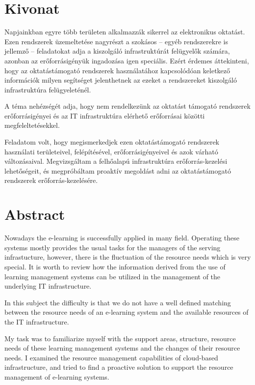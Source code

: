 \chapter*{Kivonat}

Napjainkban egyre több területen alkalmazzák sikerrel az elektronikus oktatást. Ezen rendszerek üzemeltetése nagyrészt a szokásos -- egyéb rendszerekre is jellemző -- feladatokat adja a kiszolgáló infrastruktúrát felügyelők számára, azonban az erőforrásigényük ingadozása igen speciális. Ezért érdemes áttekinteni, hogy az oktatástámogató rendszerek használatához kapcsolódóan keletkező információk milyen segítséget jelenthetnek az ezeket a rendszereket kiszolgáló infrastruktúra felügyeleténél.

A téma nehézségét adja, hogy nem rendelkezünk az oktatást támogató rendszerek erőforrásigényei és az IT infrastruktúra elérhető erőforrásai közötti megfeleltetésekkel.

Feladatom volt, hogy megismerkedjek ezen oktatástámogató rendszerek használati területeivel, felépítésével, erőforrásigényeivel és azok várható változásaival. Megvizsgáltam a felhőalapú infrastruktúra erőforrás-kezelési lehetőségeit, és megpróbáltam proaktív megoldást adni az oktatástámogató rendszerek erőforrás-kezelésére.
\vfill

\chapter*{Abstract}

Nowadays the e-learning is successfully applied in many field. Operating these systems mostly provides the usual tasks for the managers of the serving infrastucture, however, there is the fluctuation of the resource needs which is very special. It is worth to review how the information derived from the use of learning management systems can be utilized in the management of the underlying IT infrastructure.

In this subject the difficulty is that we do not have a well defined matching between the resource needs of an e-learning system and the available resources of the IT infrastructure.

My task was to familiarize myself with the support areas, structure, resource needs of these learning management systems and the changes of their resource needs. I examined the resource management capabilities of cloud-based infrastructure, and tried to find a proactive solution to support the resource management of e-learning systems.

\vfill

